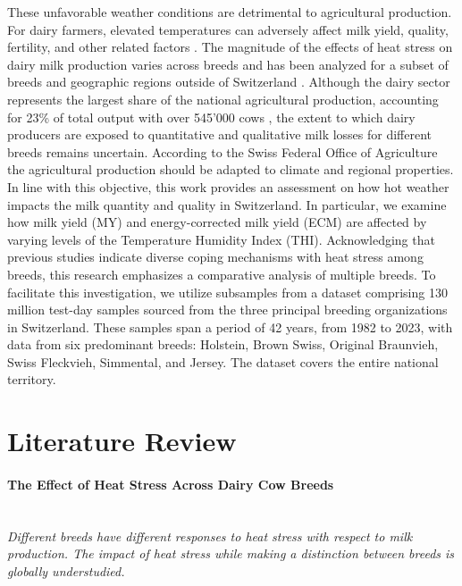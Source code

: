  These unfavorable weather conditions are detrimental to agricultural production. For dairy farmers, elevated temperatures can adversely affect milk yield, quality, fertility, and other related factors \citep{bernabucci_effect_2015,lambertz_climatic_2014, bohmanova_temperature-humidity_2007, dunn_analysis_2014,ranjitkar_will_2020, west_effects_2003, gantner_differences_2017,maggiolino_estimation_2020,salfer_annual_2019,smith_short_2013,hammami_evaluation_2013,hill_dairy_2015, vitali_effect_2015, cox_mortality_2016}. 
 The magnitude of the effects of heat stress on dairy milk production varies across breeds and has been analyzed for a subset of breeds and geographic regions outside of Switzerland \citep{bryant_quantifying_2007, smith_short_2013, gantner_differences_2017, ahmed_temperature_2022}. Although the dairy sector represents the largest share of the national agricultural production, accounting for 23\% of total output with over 545'000 cows \citep{agrarbericht_2023}, the extent to which dairy producers are exposed to quantitative and qualitative milk losses for different breeds remains uncertain. According to the Swiss Federal Office of Agriculture the agricultural production should be adapted to climate and regional properties. In line with this objective, this work provides an assessment on how hot weather impacts the milk quantity and quality in Switzerland. In particular, we examine how milk yield (MY) and energy-corrected milk yield (ECM) are affected by varying levels of the Temperature Humidity Index (THI). Acknowledging that previous studies indicate diverse coping mechanisms with heat stress among breeds, this research emphasizes a comparative analysis of multiple breeds. To facilitate this investigation, we utilize subsamples from a dataset comprising 130 million test-day samples sourced from the three principal breeding organizations in Switzerland. These samples span a period of 42 years, from 1982 to 2023, with data from six predominant breeds: Holstein, Brown Swiss, Original Braunvieh, Swiss Fleckvieh, Simmental, and Jersey. The dataset covers the entire national territory.



\section{Literature Review}
\paragraph{The Effect of Heat Stress Across Dairy Cow Breeds} \quad \\
\textit{Different breeds have different responses to heat stress with respect to milk production. The impact of heat stress while making a distinction between breeds is globally understudied.}

